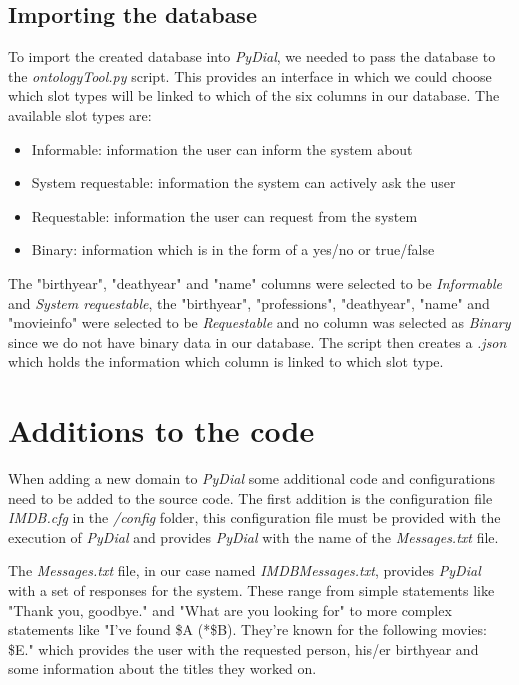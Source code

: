 \documentclass[11pt,a4paper]{article}
\begin{document}
	\subsection{Importing the database}
	To import the created database into \emph{PyDial}, we needed to pass the database to the \emph{ontologyTool.py} script. This provides an interface in which we could choose which slot types will be linked to which of the six columns in our database. The available slot types are:
	
	\begin{itemize}
		\item Informable: information the user can inform the system about
		\item System requestable: information the system can actively ask the user
		\item Requestable: information the user can request from the system
		\item Binary: information which is in the form of a yes/no or true/false
	\end{itemize}
	
	The "birthyear", "deathyear" and "name" columns were selected to be \emph{Informable} and \emph{System requestable}, the "birthyear", "professions", "deathyear", "name" and "movieinfo" were selected to be \emph{Requestable} and no column was selected as \emph{Binary} since we do not have binary data in our database. The script then creates a \emph{.json} which holds the information which column is linked to which slot type.
	
\section{Additions to the code}
\label{sec:CodeAdditions}
When adding a new domain to \emph{PyDial} some additional code and configurations need to be added to the source code. The first addition is the configuration file \emph{IMDB.cfg} in the \emph{/config} folder, this configuration file must be provided with the execution of \emph{PyDial} and provides \emph{PyDial} with the name of the \emph{Messages.txt} file.

The \emph{Messages.txt} file, in our case named \emph{IMDBMessages.txt}, provides \emph{PyDial} with a set of responses for the system. These range from simple statements like "Thank you, goodbye." and "What are you looking for" to more complex statements like "I've found \$A (*\$B). They're known for the following movies: \$E." which provides the user with the requested person, his/er birthyear and some information about the titles they worked on.
\end{document}
